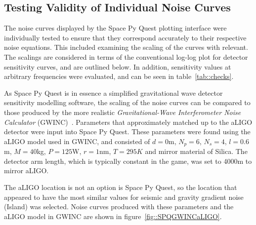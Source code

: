 \documentclass{article}
\begin{document}
\subsection{Testing Validity of Individual Noise Curves}
The noise curves displayed by the Space Py Quest plotting interface
were individually tested to ensure that they correspond accurately to
their respective noise equations. This included examining the scaling
of the curves with relevant. The scalings are considered in terms of
the conventional log-log plot for detector sensitivity curves, and are
outlined below. In addition, sensitivity values at arbitrary
frequencies were evaluated, and can be seen in
table~\ref{tab::checks}.


As Space Py Quest is in essence a simplified gravitational wave
detector sensitivity modelling software, the scaling of the noise
curves can be compared to those produced by the more realistic
\textit{Gravitational-Wave Interferometer Noise Calculator}
(GWINC)~\cite{GWINC}. Parameters that approximately matched up to the
aLIGO detector were input into Space Py Quest. These parameters were
found using the aLIGO model used in GWINC, and consisted of $d=0$m,
$N_p=6$, $N_s=4$, $l=0.6$m, $M =40$kg, $P=125$W, $r=1$nm, $T=295K$ and
mirror material of Silica. The detector arm length, which is typically
constant in the game, was set to 4000m to mirror aLIGO. 

The aLIGO location is not an option is Space Py Quest, so the location
that appeared to have the most similar values for seismic and gravity
gradient noise (Island) was selected. Noise curves produced with these
parameters and the aLIGO model in GWINC are shown in
figure~\ref{fig::SPQGWINCaLIGO}. 
\end{document}
